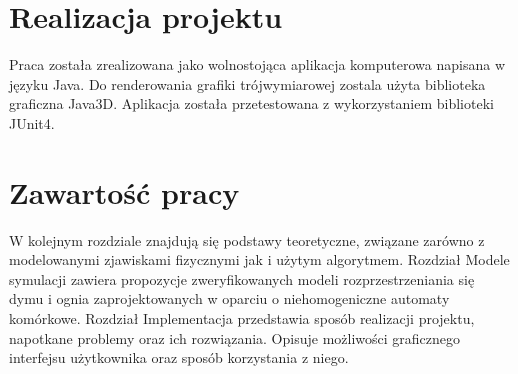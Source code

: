 \section {Realizacja projektu} %
Praca została zrealizowana jako wolnostojąca aplikacja komputerowa napisana w języku Java. Do renderowania grafiki trójwymiarowej
zostala użyta biblioteka graficzna Java3D. Aplikacja została przetestowana z wykorzystaniem biblioteki JUnit4. 

\section{Zawartość pracy} %
W kolejnym rozdziale znajdują się podstawy teoretyczne, związane zarówno z modelowanymi zjawiskami fizycznymi jak i użytym algorytmem.
Rozdział Modele symulacji zawiera propozycje zweryfikowanych modeli rozprzestrzeniania się dymu i ognia zaprojektowanych w oparciu
o niehomogeniczne automaty komórkowe. Rozdział Implementacja przedstawia sposób realizacji projektu, napotkane problemy oraz 
ich rozwiązania. Opisuje możliwości graficznego interfejsu użytkownika oraz sposób korzystania z niego.
